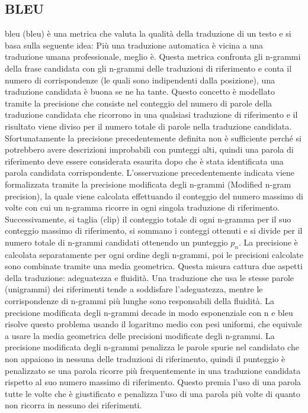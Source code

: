 \subsection{BLEU}
\acrshort{bleu} (\acrlong{bleu}) \cite{papineni2002bleu} è una metrica che valuta la qualità della traduzione di un testo e si basa sulla seguente idea: Più una traduzione automatica è vicina a una traduzione umana professionale, meglio è. 
Questa metrica confronta gli n-grammi della frase candidata con gli n-grammi delle traduzioni di riferimento e conta il numero di corrispondenze (le quali sono indipendenti dalla posizione), una traduzione candidata è buona se ne ha tante.
Questo concetto è modellato tramite la precisione che consiste nel conteggio del numero di parole della traduzione candidata che ricorrono in una qualsiasi traduzione di riferimento e il risultato viene diviso per il numero totale di parole nella traduzione candidata.
Sfortunatamente la precisione precedentemente definita non è sufficiente perché si potrebbero avere descrizioni improbabili con punteggi alti, quindi una parola di riferimento deve essere considerata esaurita dopo che è stata identificata una parola candidata corrispondente. L'osservazione precedentemente indicata viene formalizzata tramite la precisione modificata degli n-grammi (Modified n-gram precision), la quale viene calcolata effettuando il conteggio del numero massimo di volte con cui un n-gramma ricorre in ogni singola traduzione di riferimento. Successivamente, si taglia (clip) il conteggio totale di ogni n-gramma per il suo conteggio massimo di riferimento, si sommano i conteggi ottenuti e si divide per il numero totale di n-grammi candidati ottenendo un punteggio $p_n$. La precisione è calcolata separatamente per ogni ordine degli n-grammi, poi le precisioni calcolate sono combinate tramite una media geometrica. Questa misura cattura due aspetti della traduzione: adeguatezza e fluidità. Una traduzione che usa le stesse parole (unigrammi) dei riferimenti tende a soddisfare l'adeguatezza, mentre le corrispondenze di n-grammi più lunghe sono responsabili della fluidità.
La precisione modificata degli n-grammi decade in modo esponenziale con n e \acrshort{bleu} risolve questo problema usando il logaritmo medio con pesi uniformi, che equivale a usare la media geometrica delle precisioni modificate degli n-grammi.
La precisione modificata degli n-grammi penalizza le parole spurie nel candidato che non appaiono in nessuna delle traduzioni di riferimento, quindi il punteggio è penalizzato se una parola ricorre più frequentemente in una traduzione candidata rispetto al suo numero massimo di riferimento. Questo premia l'uso di una parola tutte le volte che è giustificato e penalizza l'uso di una parola più volte di quanto non ricorra in nessuno dei riferimenti. 
